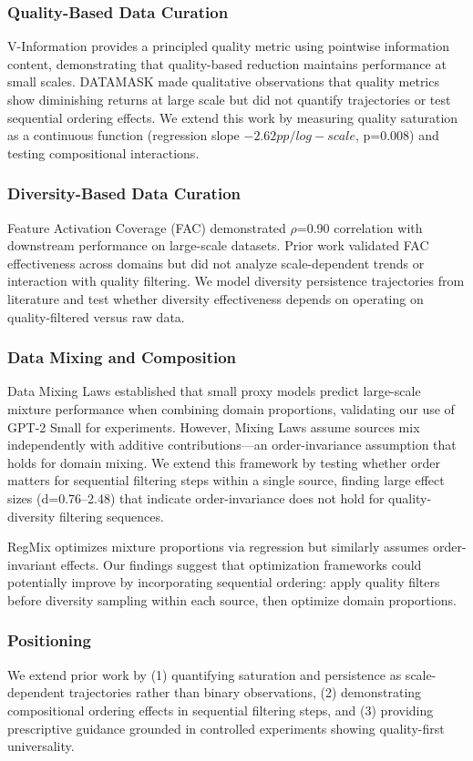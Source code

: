 
\subsubsection{Quality-Based Data Curation}

V-Information provides a principled quality metric using pointwise information content, demonstrating that quality-based reduction maintains performance at small scales. DATAMASK made qualitative observations that quality metrics show diminishing returns at large scale but did not quantify trajectories or test sequential ordering effects. We extend this work by measuring quality saturation as a continuous function (regression slope $-2.62pp/log-scale$, p=0.008) and testing compositional interactions.

\subsubsection{Diversity-Based Data Curation}

Feature Activation Coverage (FAC) demonstrated $\rho$=0.90 correlation with downstream performance on large-scale datasets. Prior work validated FAC effectiveness across domains but did not analyze scale-dependent trends or interaction with quality filtering. We model diversity persistence trajectories from literature and test whether diversity effectiveness depends on operating on quality-filtered versus raw data.

\subsubsection{Data Mixing and Composition}

Data Mixing Laws established that small proxy models predict large-scale mixture performance when combining domain proportions, validating our use of GPT-2 Small for experiments. However, Mixing Laws assume sources mix independently with additive contributions---an order-invariance assumption that holds for domain mixing. We extend this framework by testing whether order matters for sequential filtering steps within a single source, finding large effect sizes (d=0.76--2.48) that indicate order-invariance does not hold for quality-diversity filtering sequences.

RegMix optimizes mixture proportions via regression but similarly assumes order-invariant effects. Our findings suggest that optimization frameworks could potentially improve by incorporating sequential ordering: apply quality filters before diversity sampling within each source, then optimize domain proportions.

\subsubsection{Positioning}

We extend prior work by (1) quantifying saturation and persistence as scale-dependent trajectories rather than binary observations, (2) demonstrating compositional ordering effects in sequential filtering steps, and (3) providing prescriptive guidance grounded in controlled experiments showing quality-first universality.
